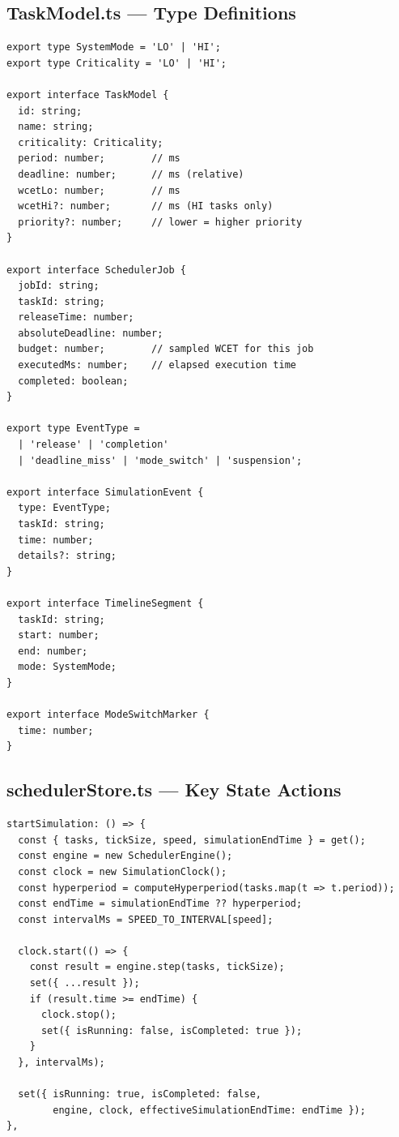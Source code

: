 \documentclass[conference]{IEEEtran}
\begin{document}
\subsection{TaskModel.ts --- Type Definitions}
\begin{lstlisting}[caption={Task model types (src/engine/TaskModel.ts)}]
export type SystemMode = 'LO' | 'HI';
export type Criticality = 'LO' | 'HI';

export interface TaskModel {
  id: string;
  name: string;
  criticality: Criticality;
  period: number;        // ms
  deadline: number;      // ms (relative)
  wcetLo: number;        // ms
  wcetHi?: number;       // ms (HI tasks only)
  priority?: number;     // lower = higher priority
}

export interface SchedulerJob {
  jobId: string;
  taskId: string;
  releaseTime: number;
  absoluteDeadline: number;
  budget: number;        // sampled WCET for this job
  executedMs: number;    // elapsed execution time
  completed: boolean;
}

export type EventType =
  | 'release' | 'completion'
  | 'deadline_miss' | 'mode_switch' | 'suspension';

export interface SimulationEvent {
  type: EventType;
  taskId: string;
  time: number;
  details?: string;
}

export interface TimelineSegment {
  taskId: string;
  start: number;
  end: number;
  mode: SystemMode;
}

export interface ModeSwitchMarker {
  time: number;
}
\end{lstlisting}

\subsection{schedulerStore.ts --- Key State Actions}
\begin{lstlisting}[caption={Store actions (src/store/schedulerStore.ts)}]
startSimulation: () => {
  const { tasks, tickSize, speed, simulationEndTime } = get();
  const engine = new SchedulerEngine();
  const clock = new SimulationClock();
  const hyperperiod = computeHyperperiod(tasks.map(t => t.period));
  const endTime = simulationEndTime ?? hyperperiod;
  const intervalMs = SPEED_TO_INTERVAL[speed];

  clock.start(() => {
    const result = engine.step(tasks, tickSize);
    set({ ...result });
    if (result.time >= endTime) {
      clock.stop();
      set({ isRunning: false, isCompleted: true });
    }
  }, intervalMs);

  set({ isRunning: true, isCompleted: false,
        engine, clock, effectiveSimulationEndTime: endTime });
},
\end{lstlisting}
\end{document}
